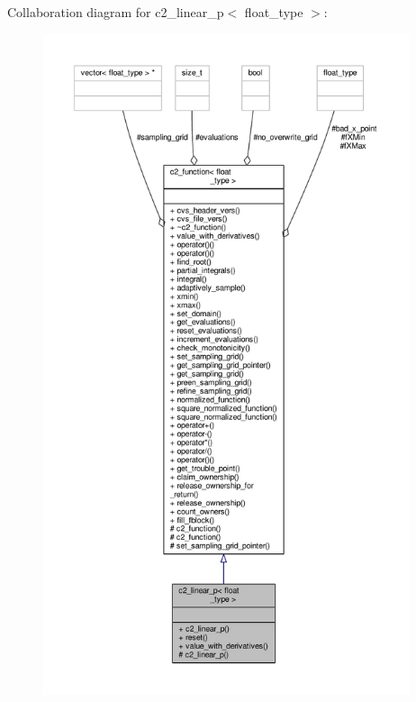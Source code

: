 Collaboration diagram for c2\+\_\+linear\+\_\+p$<$ float\+\_\+type $>$\+:
\nopagebreak
\begin{figure}[H]
\begin{center}
\leavevmode
\includegraphics[height=550pt]{classc2__linear__p__coll__graph}
\end{center}
\end{figure}
